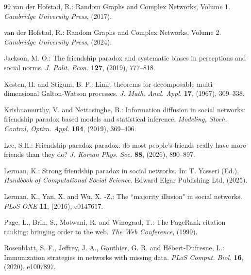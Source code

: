 \documentclass[11pt]{article}
\numberwithin{equation}{section}
\theoremstyle{plain}
\begin{document}
\begin{thebibliography}{99}
van der Hofstad, R.: Random Graphs and Complex Networks, Volume 1. \emph{Cambridge University Press}, (2017).

van der Hofstad, R.: Random Graphs and Complex Networks, Volume 2. \emph{Cambridge University Press}, (2024).

Jackson, M. O.: The friendship paradox and systematic biases in perceptions and social norms. \emph{J. Polit. Econ.} \textbf{127}, (2019), 777--818.

Kesten, H. and Stigum, B. P.: Limit theorems for decomposable multi-dimensional Galton-Watson processes. \emph{J. Math. Anal. Appl.} \textbf{17}, (1967), 309--338.

Krishnamurthy, V. and Nettasinghe, B.: Information diffusion in social networks: friendship paradox based models and statistical inference. \emph{Modeling, Stoch. Control, Optim. Appl.} \textbf{164}, (2019), 369--406.

Lee, S.H.: Friendship-paradox paradox: do most people's friends really have more friends than they do?
\emph{J. Korean Phys. Soc.} \textbf{88}, (2026), 890--897.

Lerman, K.: Strong friendship paradox in social networks. In: T. Yasseri (Ed.), \emph{Handbook of Computational Social Science}.
Edward Elgar Publishing Ltd, (2025).

Lerman, K., Yan, X. and Wu, X. -Z.: The ``majority illusion" in social networks. \emph{PLoS ONE} \textbf{11}, (2016), e0147617.

Page, L., Brin, S., Motwani, R. and Winograd, T.: The PageRank citation ranking: bringing order to the web. \emph{The Web Conference}, (1999).

Rosenblatt, S. F., Jeffrey, J. A., Gauthier, G. R. and Hébert-Dufresne, L.: Immunization strategies in networks with missing data. \emph{PLoS Comput. Biol.} \textbf{16}, (2020), e1007897.

\end{thebibliography}

\end{document}
